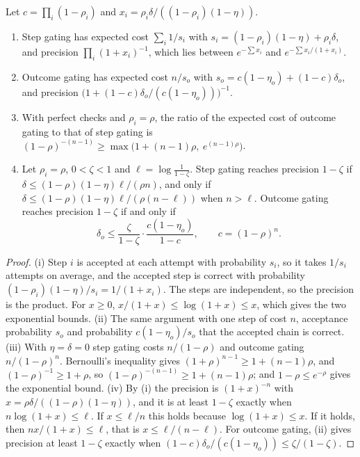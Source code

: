 \begin{theorem}\label{thm:gating}
Let $c=\prod_{i}(1-\rho_{i})$ and $x_{i}=\rho_{i}\delta/((1-\rho_{i})(1-\eta))$.
\begin{enumerate}[label=\textup{(\roman*)},leftmargin=2.2em,itemsep=1pt]
\item Step gating has expected cost $\sum_{i}1/s_{i}$ with $s_{i}=(1-\rho_{i})(1-\eta)+\rho_{i}\delta$, and precision $\prod_{i}(1+x_{i})^{-1}$, which lies between $e^{-\sum x_{i}}$ and $e^{-\sum x_{i}/(1+x_{i})}$.
\item Outcome gating has expected cost $n/s_{o}$ with $s_{o}=c(1-\eta_{o})+(1-c)\delta_{o}$, and precision $\bigl(1+(1-c)\delta_{o}/(c(1-\eta_{o}))\bigr)^{-1}$.
\item With perfect checks and $\rho_{i}=\rho$, the ratio of the expected cost of outcome gating to that of step gating is $(1-\rho)^{-(n-1)}\ge\max\bigl(1+(n-1)\rho,\ e^{(n-1)\rho}\bigr)$.
\item Let $\rho_{i}=\rho$, $0<\zeta<1$ and $\ell=\log\frac1{1-\zeta}$. Step gating reaches precision $1-\zeta$ if $\delta\le(1-\rho)(1-\eta)\ell/(\rho n)$, and only if $\delta\le(1-\rho)(1-\eta)\ell/(\rho(n-\ell))$ when $n>\ell$. Outcome gating reaches precision $1-\zeta$ if and only if
\[
\delta_{o}\le\frac{\zeta}{1-\zeta}\cdot\frac{c(1-\eta_{o})}{1-c},\qquad c=(1-\rho)^{n}.
\]
\end{enumerate}
\end{theorem}

\begin{proof}
(i) Step $i$ is accepted at each attempt with probability $s_{i}$, so it takes $1/s_{i}$ attempts on average, and the accepted step is correct with probability $(1-\rho_{i})(1-\eta)/s_{i}=1/(1+x_{i})$. The steps are independent, so the precision is the product. For $x\ge0$, $x/(1+x)\le\log(1+x)\le x$, which gives the two exponential bounds.
(ii) The same argument with one step of cost $n$, acceptance probability $s_{o}$ and probability $c(1-\eta_{o})/s_{o}$ that the accepted chain is correct.
(iii) With $\eta=\delta=0$ step gating costs $n/(1-\rho)$ and outcome gating $n/(1-\rho)^{n}$. Bernoulli's inequality gives $(1+\rho)^{n-1}\ge1+(n-1)\rho$, and $(1-\rho)^{-1}\ge1+\rho$, so $(1-\rho)^{-(n-1)}\ge1+(n-1)\rho$; and $1-\rho\le e^{-\rho}$ gives the exponential bound.
(iv) By (i) the precision is $(1+x)^{-n}$ with $x=\rho\delta/((1-\rho)(1-\eta))$, and it is at least $1-\zeta$ exactly when $n\log(1+x)\le\ell$. If $x\le\ell/n$ this holds because $\log(1+x)\le x$. If it holds, then $nx/(1+x)\le\ell$, that is $x\le\ell/(n-\ell)$. For outcome gating, (ii) gives precision at least $1-\zeta$ exactly when $(1-c)\delta_{o}/(c(1-\eta_{o}))\le\zeta/(1-\zeta)$.
\end{proof}

